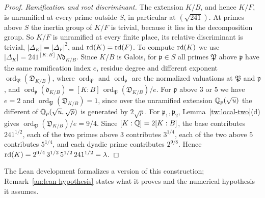 \begin{proof}
\emph{Ramification and root discriminant.} The extension $K/B$, and hence
$K/F$, is unramified at every prime outside $S$, in particular at
$(\sqrt{241})$. At primes above $S$ the inertia group of $K/F$ is trivial,
because it lies in the decomposition group. So $K/F$ is unramified at every
finite place, its relative discriminant is trivial, $|\Delta_K|=|\Delta_F|^2$,
and $\operatorname{rd}(K)=\operatorname{rd}(F)$. To compute $\operatorname{rd}(K)$ we use
$|\Delta_K|=241^{[K:B]}N\mathfrak d_{K/B}$. Since $K/B$ is Galois, for
$\mathfrak p\in S$ all primes $\mathfrak P$ above $\mathfrak p$ have the same
ramification index $e$, residue degree and different exponent
$\operatorname{ord}_{\mathfrak P}(\mathfrak D_{K/B})$, where
$\operatorname{ord}_{\mathfrak P}$ and $\operatorname{ord}_{\mathfrak p}$ are
the normalized valuations at $\mathfrak P$ and $\mathfrak p$, and
$\operatorname{ord}_{\mathfrak p}(\mathfrak d_{K/B})=[K:B]\,\operatorname{ord}_{\mathfrak P}(\mathfrak D_{K/B})/e$.
For $\mathfrak p$ above $3$ or $5$ we have $e=2$ and
$\operatorname{ord}_{\mathfrak P}(\mathfrak D_{K/B})=1$, since over the unramified extension
$\mathbb Q_p(\sqrt u)$ the different of $\mathbb Q_p(\sqrt u,\sqrt p)$ is generated by
$2\sqrt p$. For $\mathfrak p_1,\mathfrak p_2$, Lemma~\ref{tw:local-two}(d)
gives $\operatorname{ord}_{\mathfrak P}(\mathfrak D_{K/B})/e=9/4$. Since $[K:\mathbb Q]=2[K:B]$, the
base contributes $241^{1/2}$, each of the two primes above $3$ contributes
$3^{1/4}$, each of the two above $5$ contributes $5^{1/4}$, and each dyadic
prime contributes $2^{9/8}$. Hence
$\operatorname{rd}(K)=2^{9/4}\,3^{1/2}\,5^{1/2}\,241^{1/2}=\lambda$.
\end{proof}

\begin{remark}\label{tw:lean-remark}
The Lean development \cite{NaslundLean2026} formalizes a version of this
construction; Remark~\ref{an:lean-hypothesis} states what it proves and the
numerical hypothesis it assumes.
\end{remark}
